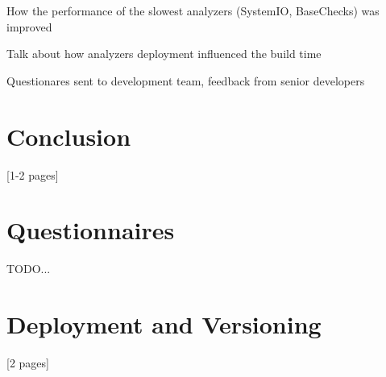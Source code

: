 \documentclass[
  digital, %
  table,   %
  lof,     %
  lot,     %
  oneside,
]{fithesis3}
\begin{document}
How the performance of the slowest analyzers (SystemIO, BaseChecks) was improved

Talk about how analyzers deployment influenced the build time

Questionares sent to development team, feedback from senior developers

\chapter{Conclusion}
[1-2 pages]

	\makeatletter\thesis@blocks@clear\makeatother

	\printindex
    
  \printbibliography

	\appendix %
  \chapter{Questionnaires}
TODO...

  \chapter{Deployment and Versioning}
[2 pages]
\end{document}
